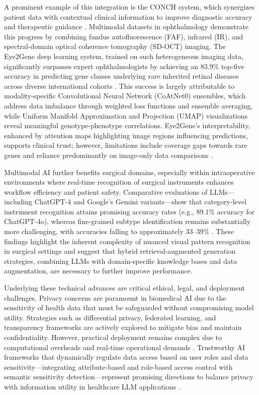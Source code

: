 \documentclass[sigconf]{acmart}
\begin{document}
A prominent example of this integration is the CONCH system, which synergizes patient data with contextual clinical information to improve diagnostic accuracy and therapeutic guidance \cite{ref12}. Multimodal datasets in ophthalmology demonstrate this progress by combining fundus autofluorescence (FAF), infrared (IR), and spectral-domain optical coherence tomography (SD-OCT) imaging. The Eye2Gene deep learning system, trained on such heterogeneous imaging data, significantly surpasses expert ophthalmologists by achieving an 83.9\% top-five accuracy in predicting gene classes underlying rare inherited retinal diseases across diverse international cohorts \cite{ref10}. This success is largely attributable to modality-specific Convolutional Neural Network (CoAtNet0) ensembles, which address data imbalance through weighted loss functions and ensemble averaging, while Uniform Manifold Approximation and Projection (UMAP) visualizations reveal meaningful genotype-phenotype correlations. Eye2Gene’s interpretability, enhanced by attention maps highlighting image regions influencing predictions, supports clinical trust; however, limitations include coverage gaps towards rare genes and reliance predominantly on image-only data comparisons \cite{ref10}.

Multimodal AI further benefits surgical domains, especially within intraoperative environments where real-time recognition of surgical instruments enhances workflow efficiency and patient safety. Comparative evaluations of LLMs—including ChatGPT-4 and Google's Gemini variants—show that category-level instrument recognition attains promising accuracy rates (e.g., 89.1\% accuracy for ChatGPT-4o), whereas fine-grained subtype identification remains substantially more challenging, with accuracies falling to approximately 33–39\% \cite{ref26}. These findings highlight the inherent complexity of nuanced visual pattern recognition in surgical settings and suggest that hybrid retrieval-augmented generation strategies, combining LLMs with domain-specific knowledge bases and data augmentation, are necessary to further improve performance.

Underlying these technical advances are critical ethical, legal, and deployment challenges. Privacy concerns are paramount in biomedical AI due to the sensitivity of health data that must be safeguarded without compromising model utility. Strategies such as differential privacy, federated learning, and transparency frameworks are actively explored to mitigate bias and maintain confidentiality. However, practical deployment remains complex due to computational overheads and real-time operational demands \cite{ref11,ref12}. Trustworthy AI frameworks that dynamically regulate data access based on user roles and data sensitivity—integrating attribute-based and role-based access control with semantic sensitivity detection—represent promising directions to balance privacy with information utility in healthcare LLM applications \cite{ref11}.
\end{document}
